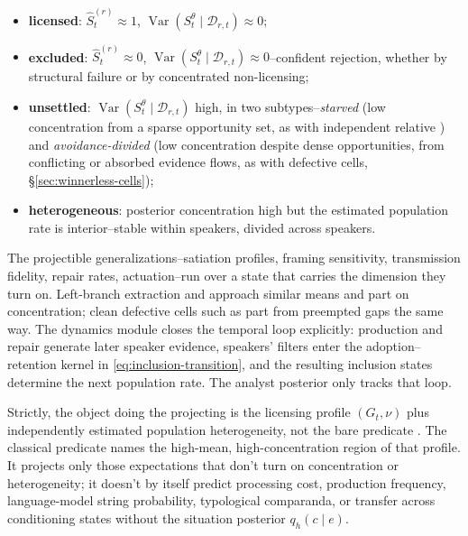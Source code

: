 \begin{itemize}
\item \textbf{licensed}: $\widehat S^{(r)}_t\approx1$,
  $\operatorname{Var}(S_t^{\theta}\mid\mathcal{D}_{r,t})\approx0$;
\item \textbf{excluded}: $\widehat S^{(r)}_t\approx0$,
  $\operatorname{Var}(S_t^{\theta}\mid\mathcal{D}_{r,t})\approx0$--confident
  rejection, whether by structural failure or by concentrated non-licensing;
\item \textbf{unsettled}: $\operatorname{Var}(S_t^{\theta}\mid\mathcal{D}_{r,t})$
  high, in two subtypes--\emph{starved} (low concentration from a sparse
  opportunity set, as with independent relative ) and
  \emph{avoidance-divided} (low concentration despite dense opportunities, from
  conflicting or absorbed evidence flows, as with defective cells,
  \S\ref{sec:winnerless-cells});
\item \textbf{heterogeneous}: posterior concentration high but the estimated
  population rate is interior--stable within speakers, divided across speakers.
\end{itemize}

The projectible generalizations--satiation profiles, framing sensitivity,
transmission fidelity, repair rates, actuation--run over a state that carries the
dimension they turn on. Left-branch extraction and  approach
similar means and part on concentration; clean defective cells such as
  part from preempted gaps the same way. The dynamics
module closes the temporal loop explicitly: production and repair generate later
speaker evidence, speakers' filters enter the adoption--retention kernel in
\eqref{eq:inclusion-transition}, and the resulting inclusion states determine
the next population rate. The analyst posterior only tracks that loop.

Strictly, the object doing the projecting is the licensing profile
$(G_t,\nu)$ plus independently estimated population heterogeneity, not the
bare predicate . The classical predicate names the high-mean,
high-concentration region of that profile. It projects only those
expectations that don't turn on concentration or heterogeneity; it doesn't by
itself predict processing cost, production frequency, language-model string
probability, typological comparanda, or transfer across conditioning states
without the situation posterior $q_h(c\mid e)$.

